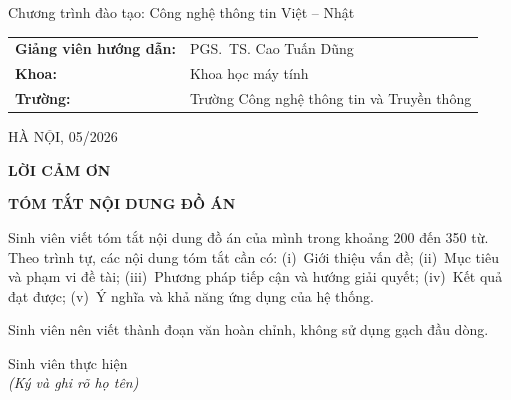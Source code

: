 \documentclass[a4paper,12pt,openany,oneside]{report}
\begin{document}
\begin{titlepage}
    {\fontsize{13pt}{16pt}\selectfont
        Chương trình đào tạo: Công nghệ thông tin Việt -- Nhật\par}

    \vspace{1.0cm}

    \begin{flushleft}
        \fontsize{12pt}{15pt}\selectfont
        \begin{tabular}{p{5.7cm}p{8.5cm}}
            \textbf{Giảng viên hướng dẫn:} & PGS.~TS. Cao Tuấn Dũng \\[4pt]
            \textbf{Khoa:}                  & Khoa học máy tính \\[4pt]
            \textbf{Trường:}                & Trường Công nghệ thông tin và Truyền thông \\
        \end{tabular}
    \end{flushleft}

    \vfill

    {\fontsize{13pt}{16pt}\selectfont
        HÀ NỘI, 05/2026\par}

\end{titlepage}

\clearpage
\thispagestyle{empty}
\begin{center}
    {\bfseries\fontsize{18pt}{22pt}\selectfont LỜI CẢM ƠN}
\end{center}
\vspace{1.5cm}


\clearpage
\thispagestyle{empty}
\begin{center}
    {\bfseries\fontsize{18pt}{22pt}\selectfont TÓM TẮT NỘI DUNG ĐỒ ÁN}
\end{center}
\vspace{1.5cm}

Sinh viên viết tóm tắt nội dung đồ án của mình trong khoảng 200 đến 350 từ.
Theo trình tự, các nội dung tóm tắt cần có:
(i)~Giới thiệu vấn đề;
(ii)~Mục tiêu và phạm vi đề tài;
(iii)~Phương pháp tiếp cận và hướng giải quyết;
(iv)~Kết quả đạt được;
(v)~Ý nghĩa và khả năng ứng dụng của hệ thống.

Sinh viên nên viết thành đoạn văn hoàn chỉnh, không sử dụng gạch đầu dòng.

\vspace{2cm}
\begin{flushright}
    Sinh viên thực hiện\\[4pt]
    {\itshape (Ký và ghi rõ họ tên)}
\end{flushright}
\end{document}
